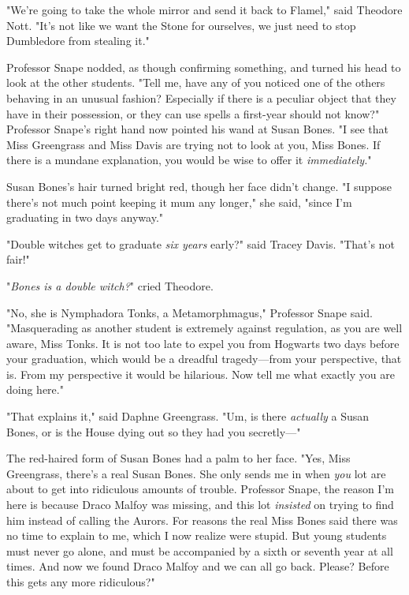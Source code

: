 "We're going to take the whole mirror and send it back to Flamel," said 
Theodore Nott. "It's not like we want the Stone for ourselves, we just need to 
stop Dumbledore from stealing it."

Professor Snape nodded, as though confirming something, and turned his head to 
look at the other students. "Tell me, have any of you noticed one of the others 
behaving in an unusual fashion? Especially if there is a peculiar object that 
they have in their possession, or they can use spells a first-year should not 
know?" Professor Snape's right hand now pointed his wand at Susan Bones. "I see 
that Miss Greengrass and Miss Davis are trying not to look at you, Miss Bones. 
If there is a mundane explanation, you would be wise to offer it 
\emph{immediately.}"

Susan Bones's hair turned bright red, though her face didn't change. "I suppose 
there's not much point keeping it mum any longer," she said, "since I'm 
graduating in two days anyway."

"Double witches get to graduate \emph{six years} early?" said Tracey Davis. 
"That's not fair!"

"\emph{Bones is a double witch?}" cried Theodore.

"No, she is Nymphadora Tonks, a Metamorphmagus," Professor Snape said. 
"Masquerading as another student is extremely against regulation, as you are 
well aware, Miss Tonks. It is not too late to expel you from Hogwarts two days 
before your graduation, which would be a dreadful tragedy---from your 
perspective, that is. From my perspective it would be hilarious. Now tell me 
what exactly you are doing here."

"That explains it," said Daphne Greengrass. "Um, is there \emph{actually} a 
Susan Bones, or is the House dying out so they had you secretly---"

The red-haired form of Susan Bones had a palm to her face. "Yes, Miss 
Greengrass, there's a real Susan Bones. She only sends me in when \emph{you} 
lot are about to get into ridiculous amounts of trouble. Professor Snape, the 
reason I'm here is because Draco Malfoy was missing, and this lot 
\emph{insisted} on trying to find him instead of calling the Aurors. For 
reasons the real Miss Bones said there was no time to explain to me, which I 
now realize were stupid. But young students must never go alone, and must be 
accompanied by a sixth or seventh year at all times. And now we found Draco 
Malfoy and we can all go back. Please? Before this gets any more ridiculous?"

